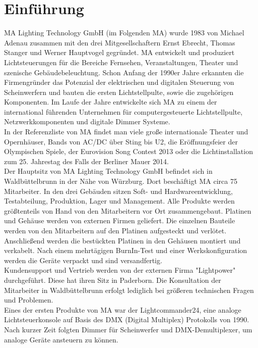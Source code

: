 \documentclass{scrartcl}
\begin{document}
\section{Einführung}
MA Lighting Technology GmbH (im Folgenden MA) wurde 1983 von Michael Adenau zusammen mit
den drei Mitgesellschaftern Ernst Ebrecht, Thomas Stanger und Werner Hauptvogel gegründet. MA
entwickelt und produziert Lichtsteuerungen für die Bereiche Fernsehen, Veranstaltungen, Theater
und szenische Gebäudebeleuchtung. Schon Anfang der 1990er Jahre erkannten die Firmengründer
das Potenzial der elektrischen und digitalen Steuerung von Scheinwerfern und bauten die ersten
Lichtstellpulte, sowie die zugehörigen Komponenten. Im Laufe der Jahre entwickelte sich MA zu
einem der international führenden Unternehmen für computergesteuerte Lichtstellpulte,
Netzwerkkomponenten und digitale Dimmer Systeme.\\
In der Referenzliste von MA findet man viele große internationale Theater und Opernhäuser, Bands
von AC/DC über Sting bis U2, die Eröffnungsfeier der Olympischen Spiele, der Eurovision Song
Contest 2013 oder die Lichtinstallation zum 25. Jahrestag des Falls der Berliner Mauer 2014.\\
Der Hauptsitz von MA Lighting Technology GmbH
befindet sich in Waldbüttelbrunn in der Nähe von
Würzburg. Dort beschäftigt MA circa 75 Mitarbeiter. In
den drei Gebäuden sitzen Soft- und Hardwareentwicklung,
Testabteilung, Produktion, Lager und
Management. Alle Produkte werden größtenteils von
Hand von den Mitarbeitern vor Ort zusammengebaut.
Platinen und Gehäuse werden von externen Firmen
geliefert. Die einzelnen Bauteile werden von den
Mitarbeitern auf den Platinen aufgesteckt und verlötet.
Anschließend werden die bestückten Platinen in den Gehäusen montiert und verkabelt. Nach einem
mehrtägigen BurnIn-Test und einer Werkskonfiguration werden die Geräte verpackt und sind
versandfertig.\\
Kundensupport und Vertrieb werden von der externen Firma "Lightpower" durchgeführt. Diese hat
ihren Sitz in Paderborn. Die Konsultation der Mitarbeiter in Waldbüttelbrunn erfolgt lediglich bei
größeren technischen Fragen und Problemen.\\
Eines der ersten Produkte von MA war der Lightcommander24, eine analoge Lichtsteuerkonsole auf
Basis des DMX (Digital Multiplex) Protokolls von 1990. Nach kurzer Zeit folgten Dimmer für
Scheinwerfer und DMX-Demultiplexer, um analoge Geräte ansteuern zu können.\\
\\
\end{document}
